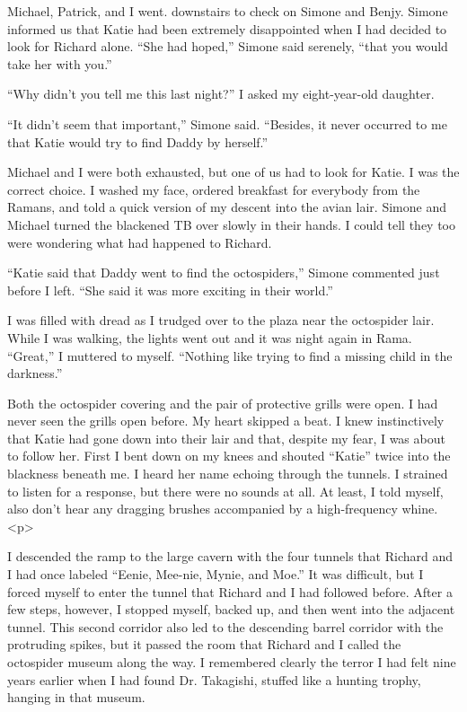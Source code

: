 \documentclass[]{article}
\begin{document}
Michael, Patrick, and I went. downstairs to check on Simone and Benjy. Simone informed us that Katie had been extremely disappointed when I had decided to look for Richard alone. “She had hoped,” Simone said serenely, “that you would take her with you.”

“Why didn’t you tell me this last night?” I asked my eight-year-old daughter.

“It didn’t seem that important,” Simone said. “Besides, it never occurred to me that Katie would try to find Daddy by herself.”

Michael and I were both exhausted, but one of us had to look for Katie. I was the correct choice. I washed my face, ordered breakfast for everybody from the Ramans, and told a quick version of my descent into the avian lair. Simone and Michael turned the blackened TB over slowly in their hands. I could tell they too were wondering what had happened to Richard.

“Katie said that Daddy went to find the octospiders,” Simone commented just before I left. “She said it was more exciting in their world.”

I was filled with dread as I trudged over to the plaza near the octospider lair. While I was walking, the lights went out and it was night again in Rama. “Great,” I muttered to myself. “Nothing like trying to find a missing child in the darkness.”

Both the octospider covering and the pair of protective grills were open. I had never seen the grills open before. My heart skipped a beat. I knew instinctively that Katie had gone down into their lair and that, despite my fear, I was about to follow her. First I bent down on my knees and shouted “Katie” twice into the blackness beneath me. I heard her name echoing through the tunnels. I strained to listen for a response, but there were no sounds at all. At least, I told myself, also don’t hear any dragging brushes accompanied by a high-frequency whine.<p>

I descended the ramp to the large cavern with the four tunnels that Richard and I had once labeled “Eenie, Mee-nie, Mynie, and Moe.” It was difficult, but I forced myself to enter the tunnel that Richard and I had followed before. After a few steps, however, I stopped myself, backed up, and then went into the adjacent tunnel. This second corridor also led to the descending barrel corridor with the protruding spikes, but it passed the room that Richard and I called the octospider museum along the way. I remembered clearly the terror I had felt nine years earlier when I had found Dr. Takagishi, stuffed like a hunting trophy, hanging in that museum.
\end{document}
